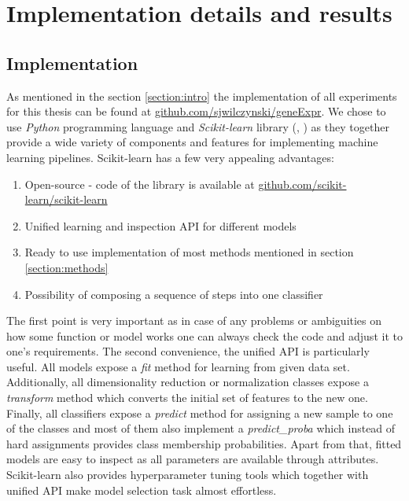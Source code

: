 \documentclass[shortabstract, english, mgr]{iithesis}
\begin{document}
\chapter{Implementation details and results} \label{section:results}

\section{Implementation}

As mentioned in the section \ref{section:intro} the implementation of all experiments for this thesis can be found at \url{github.com/sjwilczynski/geneExpr}. We chose to use \textit{Python} programming language and \textit{Scikit-learn} library (\cite{sklearn1}, \cite{sklearn2}) as they together provide a wide variety of components and features for implementing machine learning pipelines. Scikit-learn has a few very appealing advantages:
\begin{enumerate}
    \item Open-source - code of the library is available at \url{github.com/scikit-learn/scikit-learn}
    \item Unified learning and inspection API for different models
    \item Ready to use implementation of most methods mentioned in section \ref{section:methods}
    \item Possibility of composing a sequence of steps into one classifier 
\end{enumerate}
The first point is very important as in case of any problems or ambiguities on how some function or model works one can always check the code and adjust it to one's requirements. The second convenience, the unified API is particularly useful. All models expose a \textit{fit} method for learning from given data set. Additionally, all dimensionality reduction or normalization classes expose a \textit{transform} method which converts the initial set of features to the new one. Finally, all classifiers expose a \textit{predict} method for assigning a new sample to one of the classes and most of them also implement a \textit{predict\_proba} which instead of hard assignments provides class membership probabilities. Apart from that, fitted models are easy to inspect as all parameters are available through attributes. Scikit-learn also provides hyperparameter tuning tools which together with unified API make model selection task almost effortless. 
\end{document}
